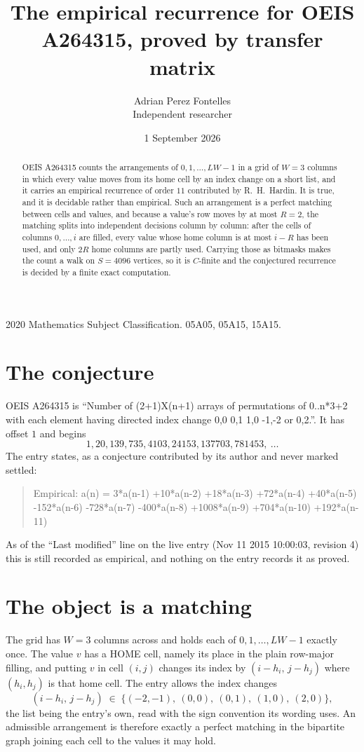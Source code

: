 \documentclass[11pt,a4paper]{article}
\title{The empirical recurrence for OEIS A264315, proved by transfer matrix}
\author{Adrian Perez Fontelles\\ \small Independent researcher}
\date{1 September 2026}
\theoremstyle{plain}
\theoremstyle{definition}
\begin{document}
\maketitle

\begin{abstract}
OEIS A264315 counts the arrangements of $0,1,\dots,LW-1$ in a grid of $W=3$ columns in which
every value moves from its home cell by an index change on a short list, and it carries an
empirical recurrence of order $11$ contributed by R.~H.~Hardin. It is true, and it is
decidable rather than empirical. Such an arrangement is a perfect matching between cells and
values, and because a value's row moves by at most $R=2$, the matching splits into
independent decisions column by column: after the cells of columns $0,\dots,i$ are filled,
every value whose home column is at most $i-R$ has been used, and only $2R$ home columns are
partly used. Carrying those as bitmasks makes the count a walk on $S=4096$ vertices, so it is
$C$-finite and the conjectured recurrence is decided by a finite exact computation.
\end{abstract}

\noindent\small 2020 Mathematics Subject Classification. 05A05, 05A15, 15A15.\normalsize

\section{The conjecture}

OEIS A264315 is ``Number of (2+1)X(n+1) arrays of permutations of 0..n*3+2 with each element having directed index change 0,0 0,1 1,0 -1,-2 or 0,2.''. It has offset $1$ and begins
\[
1, 20, 139, 735, 4103, 24153, 137703, 781453,\ \dots
\]
The entry states, as a conjecture contributed by its author and never marked settled:
\begin{quote}
Empirical: a(n) = 3*a(n-1) +10*a(n-2) +18*a(n-3) +72*a(n-4) +40*a(n-5) -152*a(n-6) -728*a(n-7) -400*a(n-8) +1008*a(n-9) +704*a(n-10) +192*a(n-11)
\end{quote}
As of the ``Last modified'' line on the live entry (Nov 11 2015 10:00:03, revision 4) this is still
recorded as empirical, and nothing on the entry records it as proved.

\section{The object is a matching}

The grid has $W=3$ columns across and holds each of $0,1,\dots,LW-1$ exactly once. The value
$v$ has a HOME cell, namely its place in the plain row-major filling, and putting $v$ in cell
$(i,j)$ changes its index by $(i-h_i,\,j-h_j)$ where $(h_i,h_j)$ is that home cell. The entry
allows the index changes
\[
(i-h_i,\,j-h_j)\;\in\;\{(-2,-1),\ (0,0),\ (0,1),\ (1,0),\ (2,0)\},
\]
the list being the entry's own, read with the sign convention its wording uses. An admissible
arrangement is therefore exactly a perfect matching in the bipartite graph joining each cell to
the values it may hold.
\end{document}
